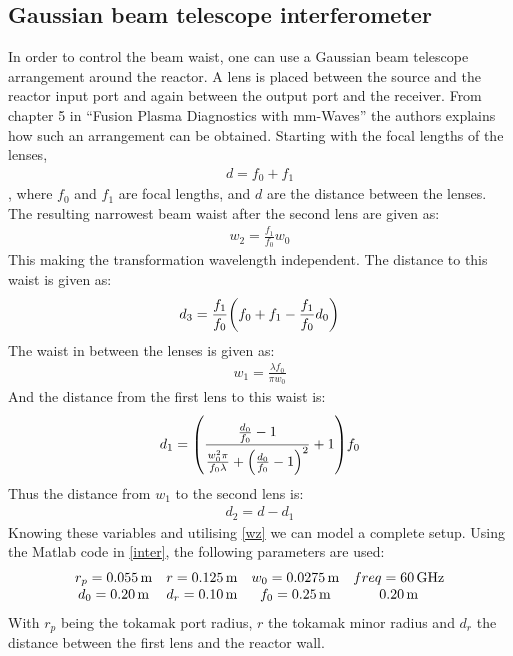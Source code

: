 \subsection{Gaussian beam telescope interferometer}
In order to control the beam waist, one can use a Gaussian beam telescope arrangement around the reactor. A lens is placed between the source and the reactor input port and again between the output port and the receiver. From chapter 5 in ``Fusion Plasma Diagnostics with mm-Waves''\cite{PlasmaDiagnosis} the authors explains how such an arrangement can be obtained. Starting with the focal lengths of the lenses,
\begin{align}
	d = f_0 + f_1
\end{align}
, where \(f_0\) and \(f_1\) are focal lengths, and \(d\) are the distance between the lenses.
The resulting narrowest beam waist after the second lens are given as:
\begin{align}
	w_2 = \frac{f_1}{f_0}w_0
\end{align}
This making the transformation wavelength independent\cite[Eq 5.118]{PlasmaDiagnosis}.
The distance to this waist is given as:
\begin{align}
	d_3 = \frac{f_1}{f_0}\pqty{f_0+f_1-\frac{f_1}{f_0}d_0}
\end{align}
The waist in between the lenses is given as:
\begin{align}
	w_1 = \frac{\lambda f_0}{\pi w_0}
\end{align}
And the distance from the first lens to this waist is:
\begin{align}
	d_1 = \pqty{\frac{\frac{d_0}{f_0}-1}{\frac{w_0^2\pi}{f_0\lambda}+\pqty{\frac{d_0}{f_0}-1}^2}+1}f_0
\end{align}
Thus the distance from \(w_1\) to the second lens is:
\begin{align}
	d_2 = d-d_1
\end{align}
Knowing these variables and utilising \cref{wz} we can model a complete setup. Using the Matlab code in \cref{inter}, the following parameters are used:
\begin{align}
	\mqty{r_p = \SI{0.055}{\meter} & r = \SI{0.125}{\meter}  & w_0 = \SI{0.0275}{\meter} & freq = \SI{60}{\giga\hertz}        \\
	d_0 = \SI{0.20}{\meter}        & d_r = \SI{0.10}{\meter} & f_0 = \SI{0.25}{\meter}   & \SI{0.20}{\meter}} \label{interin}
\end{align}
With \(r_p\) being the tokamak port radius, \(r\) the tokamak minor radius and \(d_r\) the distance between the first lens and the reactor wall.
